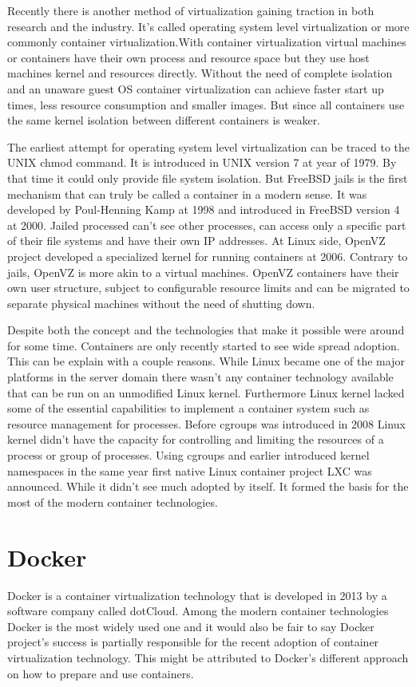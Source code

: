 \documentclass[12pt,oneandhalf,chaparabic,ceng,ms,eng,oneside,pntc]{gsufbe}
\begin{document}
Recently there is another method of virtualization gaining traction in both research and the industry.
It's called operating system level virtualization or more commonly container virtualization.With
container virtualization virtual machines or containers have their own process and resource space but
they use host machines kernel and resources directly. Without the need of complete isolation and an
unaware guest OS container virtualization can achieve faster start up times, less resource consumption
and smaller images. But since all containers use the same kernel isolation between different containers
is weaker.

The earliest attempt for operating system level virtualization can be traced to the UNIX chmod command.
It is introduced in UNIX version 7 at year of 1979. By that time it could only provide file system
isolation. But FreeBSD jails is the first mechanism that can truly be called a container in a modern
sense. It was developed by Poul-Henning Kamp at 1998 and introduced in FreeBSD version 4 at 2000.
Jailed processed can't see other processes, can access only a specific part of their file systems and
have their own IP addresses. At Linux side, OpenVZ project developed a specialized kernel for running
containers at 2006. Contrary to jails, OpenVZ is more akin to a virtual machines. OpenVZ containers
have their own user structure, subject to configurable resource limits and can be migrated to separate
physical machines without the need of shutting down.

Despite both the concept and the technologies that make it possible were around for some time.
Containers are only recently started to see wide spread adoption. This can be explain with a couple
reasons. While Linux became one of the major platforms in the server domain there wasn't any container
technology available that can be run on an unmodified Linux kernel. Furthermore Linux kernel lacked
some of the essential capabilities to implement a container system such as resource management for
processes. Before cgroups was introduced in 2008 Linux kernel didn't have the capacity for controlling
and limiting the resources of a process or group of processes. Using cgroups and earlier introduced
kernel namespaces in the same year first native Linux
container project LXC was announced. While it didn't see much adopted by itself. It formed the basis
for the most of the modern container technologies.

\section{Docker}
Docker is a container virtualization technology that is developed in 2013 by a software company called
dotCloud. Among the modern container technologies Docker is the most widely used one and it would also
be fair to say Docker project's success is partially responsible for the recent adoption of container
virtualization technology. This might be attributed to Docker's different approach on how to prepare 
and use containers.
\end{document}
